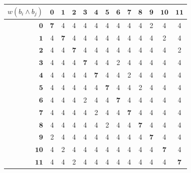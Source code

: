 \begin{tabular}{@{}r|*{12}{c}@{}}
$w(b_i\wedge b_j)$ & $\mathbf{0}$ & $\mathbf{1}$ & $\mathbf{2}$ & $\mathbf{3}$ & $\mathbf{4}$ & $\mathbf{5}$ & $\mathbf{6}$ & $\mathbf{7}$ & $\mathbf{8}$ & $\mathbf{9}$ & $\mathbf{10}$ & $\mathbf{11}$ \\
\midrule
$\mathbf{0}$ & \textbf{7} & 4 & 4 & 4 & 4 & 4 & 4 & 4 & 4 & 2 & 4 & 4 \\
$\mathbf{1}$ & \textcolor{gris}{4} & \textbf{7} & 4 & 4 & 4 & 4 & 4 & 4 & 4 & 4 & 2 & 4 \\
$\mathbf{2}$ & \textcolor{gris}{4} & \textcolor{gris}{4} & \textbf{7} & 4 & 4 & 4 & 4 & 4 & 4 & 4 & 4 & 2 \\
$\mathbf{3}$ & \textcolor{gris}{4} & \textcolor{gris}{4} & \textcolor{gris}{4} & \textbf{7} & 4 & 4 & 2 & 4 & 4 & 4 & 4 & 4 \\
$\mathbf{4}$ & \textcolor{gris}{4} & \textcolor{gris}{4} & \textcolor{gris}{4} & \textcolor{gris}{4} & \textbf{7} & 4 & 4 & 2 & 4 & 4 & 4 & 4 \\
$\mathbf{5}$ & \textcolor{gris}{4} & \textcolor{gris}{4} & \textcolor{gris}{4} & \textcolor{gris}{4} & \textcolor{gris}{4} & \textbf{7} & 4 & 4 & 2 & 4 & 4 & 4 \\
$\mathbf{6}$ & \textcolor{gris}{4} & \textcolor{gris}{4} & \textcolor{gris}{4} & \textcolor{gris}{2} & \textcolor{gris}{4} & \textcolor{gris}{4} & \textbf{7} & 4 & 4 & 4 & 4 & 4 \\
$\mathbf{7}$ & \textcolor{gris}{4} & \textcolor{gris}{4} & \textcolor{gris}{4} & \textcolor{gris}{4} & \textcolor{gris}{2} & \textcolor{gris}{4} & \textcolor{gris}{4} & \textbf{7} & 4 & 4 & 4 & 4 \\
$\mathbf{8}$ & \textcolor{gris}{4} & \textcolor{gris}{4} & \textcolor{gris}{4} & \textcolor{gris}{4} & \textcolor{gris}{4} & \textcolor{gris}{2} & \textcolor{gris}{4} & \textcolor{gris}{4} & \textbf{7} & 4 & 4 & 4 \\
$\mathbf{9}$ & \textcolor{gris}{2} & \textcolor{gris}{4} & \textcolor{gris}{4} & \textcolor{gris}{4} & \textcolor{gris}{4} & \textcolor{gris}{4} & \textcolor{gris}{4} & \textcolor{gris}{4} & \textcolor{gris}{4} & \textbf{7} & 4 & 4 \\
$\mathbf{10}$ & \textcolor{gris}{4} & \textcolor{gris}{2} & \textcolor{gris}{4} & \textcolor{gris}{4} & \textcolor{gris}{4} & \textcolor{gris}{4} & \textcolor{gris}{4} & \textcolor{gris}{4} & \textcolor{gris}{4} & \textcolor{gris}{4} & \textbf{7} & 4 \\
$\mathbf{11}$ & \textcolor{gris}{4} & \textcolor{gris}{4} & \textcolor{gris}{2} & \textcolor{gris}{4} & \textcolor{gris}{4} & \textcolor{gris}{4} & \textcolor{gris}{4} & \textcolor{gris}{4} & \textcolor{gris}{4} & \textcolor{gris}{4} & \textcolor{gris}{4} & \textbf{7} \\
\end{tabular}
